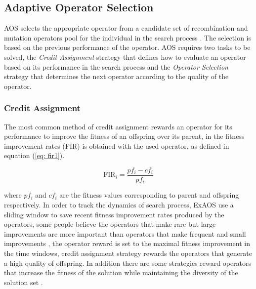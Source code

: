 \documentclass[journal]{IEEEtran}
\begin{document}
\subsection{Adaptive Operator Selection}
AOS selects the appropriate operator from a candidate set of recombination and mutation operators pool for the individual in the search process \cite{hitomi2016classification}. The selection is based on the previous performance of the operator.
AOS requires two tasks to be solved, the \textit{Credit Assignment} strategy that defines how to evaluate an operator based on its performance in the search process and the \textit{Operator Selection} strategy that determines the next operator according to the quality of the operator.

\subsubsection{Credit Assignment}
The most common method of credit assignment rewards an operator for its performance to improve the fitness of an offspring over its parent, in \cite{lin2016adaptive} the fitness improvement rates (FIR) is obtained with the used operator, as defined in equation (\ref{eq: fir1}).

\begin{equation}
  \text{FIR}_{i}=\frac{pf_{i}-cf_{i}}{pf_{i}} \label{eq: fir1}
\end{equation}

where $pf_i$ and $cf_i$ are the fitness values corresponding to parent and offspring respectively.
In order to track the dynamics of search process, ExAOS \cite{fialho2008extreme} use a sliding window to save recent fitness improvement rates produced by the operators,
some people believe the operators that make rare but large improvements are more important than operators that make frequent and small improvements \cite{fialho2009dynamic},
the operator reward is set to the maximal fitness improvement in the time windows, credit assignment strategy rewards the operators that generate a high quality of offspring.
In addition there are some strategies reward operators that increase the fitness of the solution while maintaining the diversity of the solution set \cite{auer2002finite}.
\end{document}
